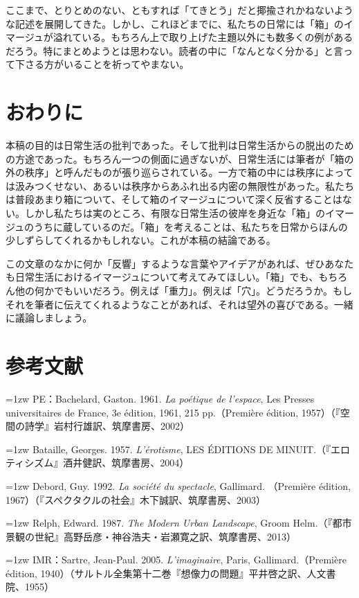 \documentclass[b5j,twoside,twocolumn]{utarticle}
\begin{document}
ここまで、とりとめのない、ともすれば「てきとう」だと揶揄されかねないような記述を展開してきた。しかし、これほどまでに、私たちの日常には「箱」のイマージュが溢れている。もちろん上で取り上げた主題以外にも数多くの例があるだろう。特にまとめようとは思わない。読者の中に「なんとなく分かる」と言って下さる方がいることを祈ってやまない。


\section{おわりに}
本稿の目的は日常生活の批判であった。そして批判は日常生活からの脱出のための方途であった。もちろん一つの側面に過ぎないが、日常生活には筆者が「箱の外の秩序」と呼んだものが張り巡らされている。一方で箱の中には秩序によっては汲みつくせない、あるいは秩序からあふれ出る内密の無限性があった。私たちは普段あまり箱について、そして箱のイマージュについて深く反省することはない。しかし私たちは実のところ、有限な日常生活の彼岸を身近な「箱」のイマージュのうちに蔵しているのだ。「箱」を考えることは、私たちを日常からほんの少しずらしてくれるかもしれない。これが本稿の結論である。


この文章のなかに何か「反響」するような言葉やアイデアがあれば、ぜひあなたも日常生活におけるイマージュについて考えてみてほしい。「箱」でも、もちろん他の何かでもいいだろう。例えば「重力」。例えば「穴」。どうだろうか。もしそれを筆者に伝えてくれるようなことがあれば、それは望外の喜びである。一緒に議論しましょう。

\section*{参考文献}
\hangindent=1zw
\noindent PE：Bachelard, Gaston. 1961.\textsl{ La poétique de l'espace}, Les Presses universitaires de France, 3e édition, 1961, 215 pp.（Première édition, 1957）（『空間の詩学』岩村行雄訳、筑摩書房、2002）

\hangindent=1zw
\noindent Bataille, Georges. 1957. \textsl{L'érotisme}, LES ÉDITIONS DE MINUIT.（『エロティシズム』酒井健訳、筑摩書房、2004）

\hangindent=1zw
\noindent Debord, Guy. 1992. \textsl{La société du spectacle}, Gallimard. （Première édition, 1967）（『スペクタクルの社会』木下誠訳、筑摩書房、2003）

\hangindent=1zw
\noindent Relph, Edward. 1987. \textsl{The Modern Urban Landscape}, Groom Helm.（『都市景観の世紀』高野岳彦・神谷浩夫・岩瀬寛之訳、筑摩書房、2013）

\hangindent=1zw
\noindent IMR：Sartre, Jean-Paul. 2005. \textsl{L'imaginaire}, Paris, Gallimard.（Première édition, 1940）（サルトル全集第十二巻『想像力の問題』平井啓之訳、人文書院、1955）
\end{document}
